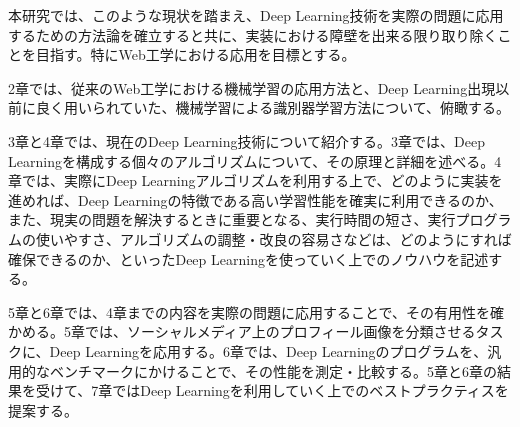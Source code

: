 本研究では、このような現状を踏まえ、Deep Learning技術を実際の問題に応用するための方法論を確立すると共に、実装における障壁を出来る限り取り除くことを目指す。特にWeb工学における応用を目標とする。\par
2章では、従来のWeb工学における機械学習の応用方法と、Deep Learning出現以前に良く用いられていた、機械学習による識別器学習方法について、俯瞰する。
\par3章と4章では、現在のDeep Learning技術について紹介する。3章では、Deep Learningを構成する個々のアルゴリズムについて、その原理と詳細を述べる。4章では、実際にDeep Learningアルゴリズムを利用する上で、どのように実装を進めれば、Deep Learningの特徴である高い学習性能を確実に利用できるのか、また、現実の問題を解決するときに重要となる、実行時間の短さ、実行プログラムの使いやすさ、アルゴリズムの調整・改良の容易さなどは、どのようにすれば確保できるのか、といったDeep Learningを使っていく上でのノウハウを記述する。\par
5章と6章では、4章までの内容を実際の問題に応用することで、その有用性を確かめる。5章では、ソーシャルメディア上のプロフィール画像を分類させるタスクに、Deep Learningを応用する。6章では、Deep Learningのプログラムを、汎用的なベンチマークにかけることで、その性能を測定・比較する。5章と6章の結果を受けて、7章ではDeep Learningを利用していく上でのベストプラクティスを提案する。
